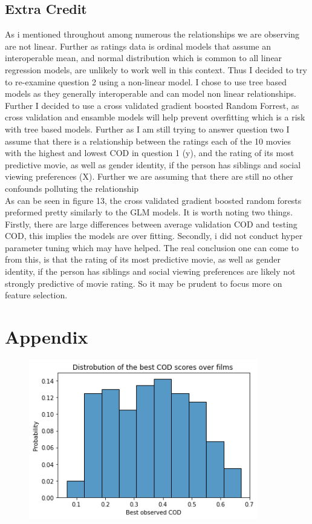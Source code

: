 \documentclass{article}
\begin{document}
\subsection*{Extra Credit}
As i mentioned throughout among numerous the relationships we are observing are not linear. Further as ratings data is ordinal models that assume an interoperable mean, and normal distribution which is common to all linear regression models, are unlikely to work well in this context. Thus I decided to try to re-examine question 2 using a non-linear model. I chose to use tree based models as they generally interoperable and can model non linear relationships. Further I decided to use a cross validated gradient boosted Random Forrest, as cross validation and ensamble models will help prevent overfitting which is a risk with tree based models. Further as I am still trying to answer question two I assume that there is a relationship between the ratings each of the 10 movies with the highest and lowest COD in question 1 (y), and the rating of its most predictive movie, as well as gender identity, if the person has siblings and social viewing preferences (X). Further we are assuming that there are still no other confounds polluting the relationship\\ As can be seen in figure 13, the cross validated gradient boosted random forests preformed pretty similarly to the GLM models. It is worth noting two things. Firstly, there are large differences between average validation COD and testing COD, this implies the models are over fitting. Secondly, i did not conduct hyper parameter tuning which may have helped. The real conclusion one can come to from this, is that   the rating of its most predictive movie, as well as gender identity, if the person has siblings and social viewing preferences are likely not strongly predictive of movie rating. So it may be prudent to focus more on feature selection.  


\newpage\section*{Appendix}

\begin{figure}[t]
  \centering

  \includegraphics[width=10cm]{data anlysis project 2/figure1.png}
 \caption{}
 \label{fig:1}
\end{figure}
\end{document}
